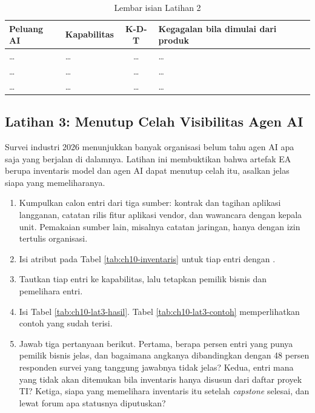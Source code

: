 \begin{table}[!htb]
  \centering
  \caption{Lembar isian Latihan 2}
  \label{tab:ch10-lat2-hasil}
  \small
  \begin{tabularx}{\textwidth}{XXcX}
    \hline
    \textbf{Peluang AI} & \textbf{Kapabilitas} & \textbf{K-D-T} & \textbf{Kegagalan bila dimulai dari produk} \\
    \hline
    \dots & \dots & \dots & \dots \\
    \hline
    \dots & \dots & \dots & \dots \\
    \hline
    \dots & \dots & \dots & \dots \\
    \hline
  \end{tabularx}
\end{table}

\subsection*{Latihan 3: Menutup Celah Visibilitas Agen AI}

Survei industri 2026 menunjukkan banyak organisasi belum tahu agen AI apa saja
yang berjalan di dalamnya. Latihan ini membuktikan bahwa artefak EA berupa
inventaris model dan agen AI dapat menutup celah itu, asalkan jelas siapa
yang memeliharanya.

\begin{enumerate}
  \item Kumpulkan calon entri dari tiga sumber: kontrak dan tagihan aplikasi
        langganan, catatan rilis fitur aplikasi vendor, dan wawancara dengan
        kepala unit. Pemakaian sumber lain, misalnya catatan jaringan, hanya
        dengan izin tertulis organisasi.
  \item Isi atribut pada Tabel \ref{tab:ch10-inventaris} untuk tiap entri
        dengan .
  \item Tautkan tiap entri ke kapabilitas, lalu tetapkan pemilik bisnis dan
        pemelihara entri.
  \item Isi Tabel \ref{tab:ch10-lat3-hasil}. Tabel \ref{tab:ch10-lat3-contoh}
        memperlihatkan contoh yang sudah terisi.
  \item Jawab tiga pertanyaan berikut. Pertama, berapa persen entri yang
        punya pemilik bisnis jelas, dan bagaimana angkanya dibandingkan
        dengan 48 persen responden survei yang tanggung jawabnya tidak jelas?
        Kedua, entri mana yang tidak akan ditemukan bila inventaris hanya
        disusun dari daftar proyek TI? Ketiga, siapa yang memelihara
        inventaris itu setelah \textit{capstone} selesai, dan lewat forum apa
        statusnya diputuskan?
\end{enumerate}

